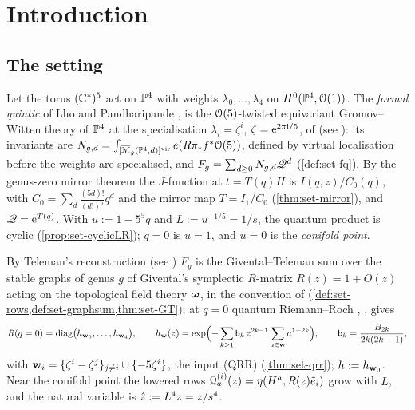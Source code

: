 \section{Introduction}
\label{sec:int}

\subsection{The setting}
\label{sec:int-setting}

Let the torus $(\mathbb{C}^*)^5$ act on $\mathbb{P}^4$ with weights $\lambda_0,\dots,\lambda_4$ on $H^0(\mathbb{P}^4,\mathcal{O}(1))$. The \emph{formal quintic} of Lho and Pandharipande \cite[\S0.2, (5)]{LP18}, \cite[\S0.2, (5)]{LP20} is the $\mathcal{O}(5)$-twisted equivariant Gromov--Witten theory of $\mathbb{P}^4$ at the specialisation $\lambda_i=\zeta^i$, $\zeta=\mathrm{e}^{2\pi\mathrm{i}/5}$, of \cite{ZZ08} (see \cite[\S3.1, (9)]{GJR18}): its invariants are $N_{g,d}=\int_{[\overline{\mathcal M}_g(\mathbb{P}^4,d)]^{\mathrm{vir}}}e(R\pi_*f^*\mathcal{O}(5))$, defined by virtual localisation \cite{MR1666787} before the weights are specialised, and $F_g=\sum_{d\geq0}N_{g,d}\mathscr{Q}^d$ (\cref{def:set-fq}). By the genus-zero mirror theorem the $J$-function at $t=T(q)H$ is $I(q,z)/C_0(q)$, with $C_0=\sum_d\frac{(5d)!}{(d!)^5}q^d$ and the mirror map $T=I_1/C_0$ (\cref{thm:set-mirror}), and $\mathscr{Q}=\mathrm{e}^{T(q)}$. With $u:=1-5^5q$ and $L:=u^{-1/5}=1/s$, the quantum product is cyclic (\cref{prop:set-cyclicLR}); $q=0$ is $u=1$, and $u=0$ is the \emph{conifold point}.

By Teleman's reconstruction \cite[Theorem~(2) in (1.15)]{MR2917177} (see \cite[\S4.1, Theorem~4.1]{GJR18}) $F_g$ is the Givental--Teleman sum over the stable graphs of genus $g$ of Givental's symplectic $R$-matrix $R(z)=1+O(z)$ acting on the topological field theory $\boldsymbol{\omega}$, in the convention of \cite[Defs.~2.2, 2.13]{PPZ15} (\cref{def:set-rows,def:set-graphsum,thm:set-GT}); at $q=0$ quantum Riemann--Roch \cite[\S2.2, Theorem~1]{Giv01}, \cite[Corollary~1]{MR2276766}, \cite[(17)]{GJR18} gives
\[
R(q=0)=\operatorname{diag}\bigl(h_{\mathbf{w}_0},\dots,h_{\mathbf{w}_4}\bigr),\qquad h_{\mathbf{w}}(z)=\exp\Bigl(-\sum_{k\geq1}\mathsf{b}_k\,z^{2k-1}\sum_{a\in\mathbf{w}}a^{1-2k}\Bigr),\qquad \mathsf{b}_k=\frac{B_{2k}}{2k(2k-1)},
\]
with $\mathbf{w}_i=\{\zeta^i-\zeta^j\}_{j\neq i}\cup\{-5\zeta^i\}$, the input (QRR) (\cref{thm:set-qrr}); $h:=h_{\mathbf{w}_0}$. Near the conifold point the lowered rows $\mathcal{Q}^{(i)}_a(z)=\eta(H^a,R(z)\tilde e_i)$ grow with $L$, and the natural variable is $\hat{z}:=L^4z=z/s^4$.

